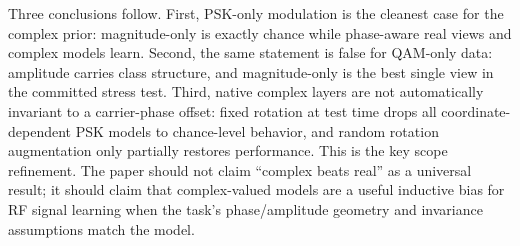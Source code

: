 \documentclass{article}
\begin{document}
\begin{table}[t]
  \centering
  \small
  \caption{Selected RF synthetic stress-test outcomes. Accuracy is mean
    test accuracy across the committed stress-test seeds. The central
    lesson is conditionality: PSK rewards phase-aware geometry, QAM
    rewards magnitude, low SNR weakens phase-only views, and global
    carrier-phase shifts require augmentation or an explicit
    invariance mechanism.}
  \label{tab:rf-stress}
\end{table}

Three conclusions follow. First, PSK-only modulation is the cleanest
case for the complex prior: magnitude-only is exactly chance while
phase-aware real views and complex models learn. Second, the same
statement is false for QAM-only data: amplitude carries class
structure, and magnitude-only is the best single view in the committed
stress test. Third, native complex layers are not automatically
invariant to a carrier-phase offset: fixed rotation at test time drops
all coordinate-dependent PSK models to chance-level behavior, and
random rotation augmentation only partially restores performance.
This is the key scope refinement. The paper should not claim
``complex beats real'' as a universal result; it should claim that
complex-valued models are a useful inductive bias for RF signal
learning when the task's phase/amplitude geometry and invariance
assumptions match the model.
\end{document}
